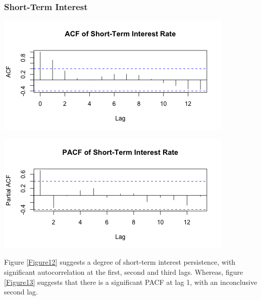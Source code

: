 \documentclass[11pt,preprint]{elsarticle}
\let\origfigure\figure
\let\endorigfigure\endfigure
\renewenvironment{figure}[1][2] {
    \expandafter\origfigure\expandafter[H]
} {
    \endorigfigure
}
\numberwithin{equation}{section}
\numberwithin{figure}{section}
\numberwithin{table}{section}
\begin{document}
\subsubsection{Short-Term Interest}\label{short-term-interest}

\begin{figure}[H]

{\centering \includegraphics{DatSci-Project-_files/figure-latex/Figure12-1} 

}

\caption{Autocorrelation Function of Short-Term Interest Rate\label{Figure12}}\label{fig:Figure12}
\end{figure}

\begin{figure}[H]

{\centering \includegraphics{DatSci-Project-_files/figure-latex/Figure13-1} 

}

\caption{ Partial Autocorrelation Function of Short-Term Interest Rate\label{Figure13}}\label{fig:Figure13}
\end{figure}

Figure \ref{Figure12} suggests a degree of short-term interest
persistence, with significant autocorrelation at the first, second and
third lags. Whereas, figure \ref{Figure13} suggests that there is a
significant PACF at lag 1, with an inconclusive second lag.
\end{document}
